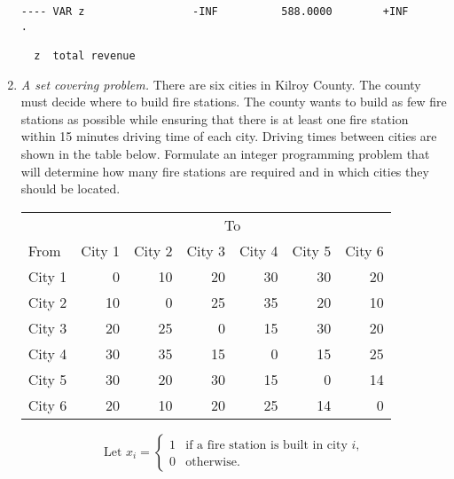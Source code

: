 \begin{enumerate}
\begin{solution}
\begin{Verbatim}
---- VAR z                 -INF          588.0000        +INF             .          

  z  total revenue
\end{Verbatim}
\end{solution}

\item \emph{A set covering problem.}
There are six cities in Kilroy County. The county must decide where to build fire
stations. The county wants to build as few fire stations as possible
while ensuring that there is at least one fire station within 15 minutes driving
time of each city. Driving times between cities are shown in the table below.
Formulate an integer programming problem that will determine how many fire
stations are required and in which cities they should be located.

\begin{center}
\begin{tabular}{l|rrrrrr}
 & \multicolumn{6}{c}{To} \\
From & City 1 & City 2 & City 3 & City 4 & City 5 & City 6 \\ \hline
City 1 & 0 & 10 & 20 & 30 & 30 & 20 \\
City 2 & 10 & 0 & 25 & 35 & 20 & 10 \\
City 3 & 20 & 25 & 0 & 15 & 30 & 20 \\
City 4 & 30 & 35 & 15 & 0 & 15 & 25 \\
City 5 & 30 & 20 & 30 & 15 & 0 & 14 \\
City 6 & 20 & 10 & 20 & 25 & 14 & 0 \\
\end{tabular}
\end{center}

\begin{solution}
  \bs
\begin{equation*}
\text{Let $x_i$} = 
\begin{cases}
1 & \text{if a fire station is built in city $i$,}\\
0 & \text{otherwise.}
\end{cases}
\end{equation*}


\end{solution}
\end{enumerate}
